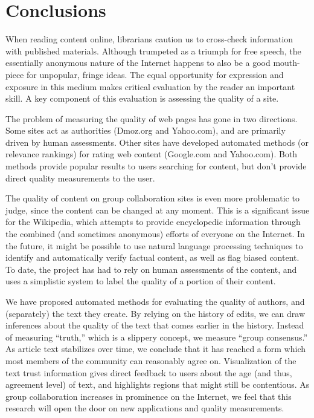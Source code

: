 \section{Conclusions}

When reading content online, librarians caution us to cross-check
information with published materials.
Although trumpeted as a triumph for free speech, the essentially
anonymous nature of the Internet happens to also be a good
mouth-piece for unpopular, fringe ideas.
The equal opportunity for expression and exposure
in this medium makes critical evaluation by
the reader an important skill.
A key component of this evaluation is assessing
the quality of a site.

The problem of measuring the quality of web pages
has gone in two directions.
Some sites act as authorities (\eg Dmoz.org and Yahoo.com),
and are primarily driven by human assessments.
Other sites have developed automated methods (or relevance rankings)
for rating web content (\eg Google.com and Yahoo.com).
Both methods provide popular results to users
searching for content, but don't provide direct quality
measurements to the user.

The quality of content on group collaboration sites
is even more problematic to judge, since the content
can be changed at any moment.
This is a significant issue for the Wikipedia,
which attempts to provide encyclopedic information
through the combined (and sometimes anonymous)
efforts of everyone on the Internet.
In the future, it might be possible to use
natural language processing techniques to identify and
automatically verify factual content, as well as flag biased content.
To date, the project has had to rely on human assessments
of the content, and uses a simplistic system
to label the quality of a portion of their content.

We have proposed automated methods for evaluating the
quality of authors, and (separately) the text they create.
By relying on the history of edits, we can draw inferences
about the quality of the text that comes earlier in the history.
Instead of measuring ``truth,'' which is a slippery concept,
we measure ``group consensus.''
As article text stabilizes over time, we conclude that it
has reached a form which most members of the community can
reasonably agree on.
Visualization of the text trust information gives direct
feedback to users about the age (and thus, agreement level)
of text, and highlights regions that might still be contentious.
As group collaboration increases in prominence on the Internet,
we feel that this research will open the door on new applications
and quality measurements.

